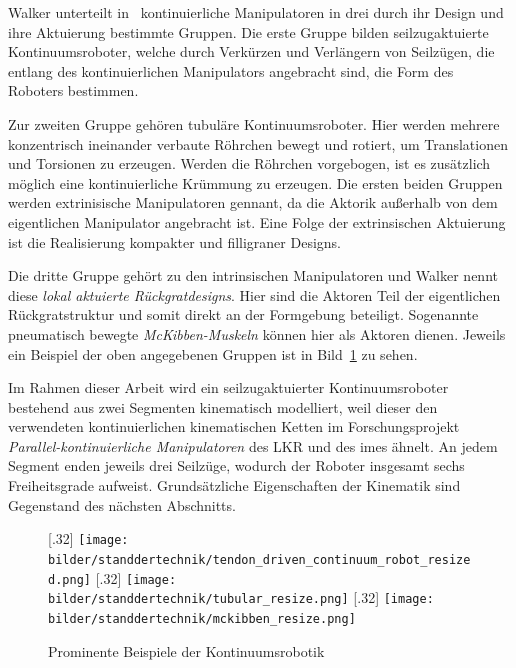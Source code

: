 Walker unterteilt in~\cite{Wal13} kontinuierliche Manipulatoren in drei durch ihr Design und ihre Aktuierung bestimmte Gruppen. Die erste Gruppe bilden seilzugaktuierte Kontinuumsroboter, welche durch Verkürzen und Verlängern von Seilzügen, die entlang des kontinuierlichen Manipulators angebracht sind, die Form des Roboters bestimmen. 

Zur zweiten Gruppe gehören tubuläre Kontinuumsroboter. Hier werden mehrere konzentrisch ineinander verbaute Röhrchen bewegt und rotiert, um Translationen und Torsionen zu erzeugen. Werden die Röhrchen vorgebogen, ist es zusätzlich möglich eine kontinuierliche Krümmung zu erzeugen. 
Die ersten beiden Gruppen werden extrinisische Manipulatoren gennant, da die Aktorik außerhalb von dem eigentlichen Manipulator angebracht ist. Eine Folge der extrinsischen Aktuierung ist die Realisierung kompakter und filligraner Designs. 

Die dritte Gruppe gehört zu den intrinsischen Manipulatoren und Walker nennt diese \textit{lokal aktuierte Rückgratdesigns}. Hier sind die Aktoren Teil der eigentlichen Rückgratstruktur und somit direkt an der Formgebung beteiligt. Sogenannte pneumatisch bewegte \textit{McKibben-Muskeln} können hier als Aktoren dienen. Jeweils ein Beispiel der oben angegebenen Gruppen ist in Bild~\ref{fig:dreiKontinuumsRoboter} zu sehen. 

Im Rahmen dieser Arbeit wird ein seilzugaktuierter Kontinuumsroboter bestehend aus zwei Segmenten kinematisch modelliert, weil dieser den verwendeten kontinuierlichen kinematischen Ketten im Forschungsprojekt \textit{Parallel-kontinuierliche Manipulatoren} des LKR und des imes ähnelt. An jedem Segment enden jeweils drei Seilzüge, wodurch der Roboter insgesamt sechs Freiheitsgrade aufweist. Grundsätzliche Eigenschaften der Kinematik sind Gegenstand des nächsten Abschnitts.

\begin{figure}[t!]
\centering
{}[.32\linewidth]
{\texttt{[image: bilder/standdertechnik/tendon\_driven\_continuum\_robot\_resized.png]}}
\label{fig:seilzugaktuiert}
[.32\linewidth]
{\texttt{[image: bilder/standdertechnik/tubular\_resize.png]}}
\label{fig:tubulaer}
[.32\linewidth]
{\texttt{[image: bilder/standdertechnik/mckibben\_resize.png]}}
\caption[Prominente Beispiele der Kontinuumsrobotik]{Prominente Beispiele der Kontinuumsrobotik}
\label{fig:dreiKontinuumsRoboter}
\end{figure}

